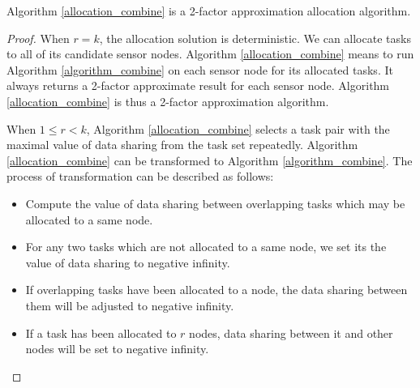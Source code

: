 \documentclass[prodmode,acmtosn]{acmsmall}
\begin{document}
\begin{theorem}
Algorithm \ref{allocation_combine} is a 2-factor approximation allocation algorithm.
\label{theorem_allocation}
\end{theorem}

\begin{proof}
When $r\mathrm{=}k$,  the allocation solution is deterministic. We can allocate tasks to all of its candidate sensor nodes. Algorithm \ref{allocation_combine} means to run Algorithm \ref{algorithm_combine} on each sensor node for its allocated tasks. It always returns a 2-factor approximate result for each sensor node.  Algorithm \ref{allocation_combine} is thus a 2-factor approximation algorithm.

When $1\mathrm{\leq} r \mathrm{<} k$, Algorithm \ref{allocation_combine} selects a task pair with the maximal value of data sharing from the task set repeatedly. Algorithm \ref{allocation_combine} can be transformed to  Algorithm \ref{algorithm_combine}. The process of transformation can be described as follows:
\begin{itemize}
\item Compute the value of data sharing between overlapping tasks which may be allocated to a same node.
\item For any two tasks which are not allocated to a same node, we set its the value of data sharing to negative infinity.
\item If overlapping tasks  have been allocated to a node, the data sharing between them will be adjusted to negative infinity.
\item If a task has been allocated to $r$ nodes, data sharing between it and other nodes will be set to negative infinity.
\end{itemize}


\end{proof}
\end{document}
